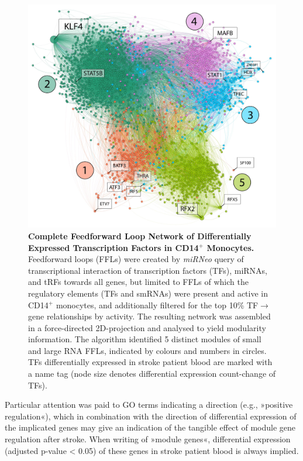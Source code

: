 \begin{figure}[ht!]
\includegraphics[width=\textwidth]{figures/cd14-ffl-modules}
\caption[Complete Feedforward Loop Network of Differentially Expressed Transcription Factors in CD14$^+$ Monocytes.]{\textbf{Complete Feedforward Loop Network of Differentially Expressed Transcription Factors in CD14$^+$ Monocytes.} Feedforward loops (FFLs) were created by \emph{miRNeo} query of transcriptional interaction of transcription factors (TFs), miRNAs, and tRFs towards all genes, but limited to FFLs of which the regulatory elements (TFs and smRNAs) were present and active in CD14$^+$ monocytes, and additionally filtered for the top 10\% TF$\to$gene relationships by activity. The resulting network was assembled in a force-directed 2D-projection and analysed to yield modularity information. The algorithm identified 5 distinct modules of small and large RNA FFLs, indicated by colours and numbers in circles. TFs differentially expressed in stroke patient blood are marked with a name tag (node size denotes differential expression count-change of TFs). 
\label{fig:cd14-ffl-modules}}
\end{figure}

Particular attention was paid to GO terms indicating a direction (e.g., »positive regulation«), which in combination with the direction of differential expression of the implicated genes may give an indication of the tangible effect of module gene regulation after stroke. When writing of »module genes«, differential expression (adjusted p-value < 0.05) of these genes in stroke patient blood is always implied.

